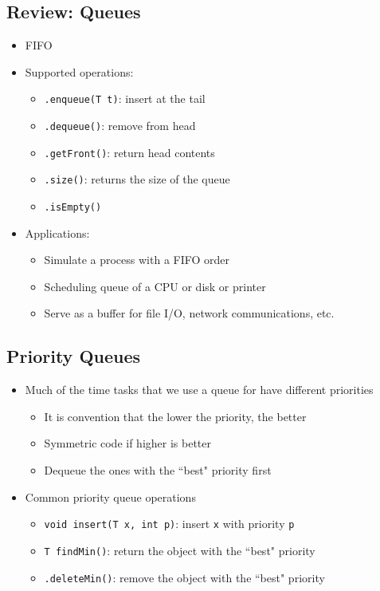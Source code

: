 \documentclass[10pt]{article}
\begin{document}
\subsection*{Review: Queues}
\begin{itemize}
    \item FIFO
    \item Supported operations:
    \begin{itemize}
        \item \texttt{.enqueue(T t)}: insert at the tail
        \item \texttt{.dequeue()}: remove from head
        \item \texttt{.getFront()}: return head contents
        \item \texttt{.size()}: returns the size of the queue
        \item \texttt{.isEmpty()}
    \end{itemize}
    \item Applications:
    \begin{itemize}
        \item Simulate a process with a FIFO order
        \item Scheduling queue of a CPU or disk or printer
        \item Serve as a buffer for file I/O, network communications, etc.
    \end{itemize}
\end{itemize}




\subsection*{Priority Queues}
\begin{itemize}
    \item Much of the time tasks that we use a queue for have different priorities
    \begin{itemize}
        \item It is convention that the lower the priority, the better
        \item Symmetric code if higher is better
        \item Dequeue the ones with the ``best" priority first
    \end{itemize}
    \item Common priority queue operations
    \begin{itemize}
        \item \texttt{void insert(T x, int p)}: insert \texttt{x} with priority \texttt{p}
        \item \texttt{T findMin()}: return the object with the ``best" priority
        \item \texttt{.deleteMin()}: remove the object with the ``best" priority
    \end{itemize}
\end{itemize}
\end{document}

